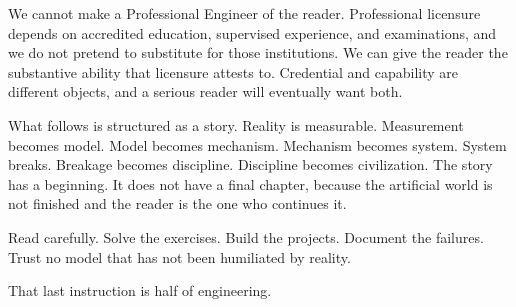 We cannot make a Professional Engineer of the reader. Professional licensure depends on accredited education, supervised experience, and examinations, and we do not pretend to substitute for those institutions. We can give the reader the substantive ability that licensure attests to. Credential and capability are different objects, and a serious reader will eventually want both.

What follows is structured as a story. Reality is measurable. Measurement becomes model. Model becomes mechanism. Mechanism becomes system. System breaks. Breakage becomes discipline. Discipline becomes civilization. The story has a beginning. It does not have a final chapter, because the artificial world is not finished and the reader is the one who continues it.

Read carefully. Solve the exercises. Build the projects. Document the failures. Trust no model that has not been humiliated by reality.

That last instruction is half of engineering.
